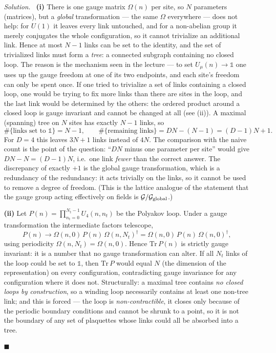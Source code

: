 \documentclass[11pt]{article}
\newenvironment{solution}{\par\smallskip\noindent\textit{Solution.}\ }{\hfill$\blacksquare$\par\smallskip}
\begin{document}
\begin{solution}
\textbf{(i)} There is one gauge matrix $\Omega(n)$ per site, so $N$ parameters (matrices), but a \emph{global} transformation --- the same $\Omega$ everywhere --- does not help: for $U(1)$ it leaves every link untouched, and for a non-abelian group it merely conjugates the whole configuration, so it cannot trivialize an additional link. Hence at most $N-1$ links can be set to the identity, and the set of trivialized links must form a \emph{tree}: a connected subgraph containing no closed loop. The reason is the mechanism seen in the lecture --- to set $U_\mu(n)\to\mathbb{1}$ one uses up the gauge freedom at one of its two endpoints, and each site's freedom can only be spent once. If one tried to trivialize a set of links containing a closed loop, one would be trying to fix more links than there are sites in the loop, and the last link would be determined by the others: the ordered product around a closed loop is gauge invariant and cannot be changed at all (see (ii)). A maximal (spanning) tree on $N$ sites has exactly $N-1$ links, so
\begin{equation}
\#\{\text{links set to }\mathbb{1}\} = N-1, \qquad \#\{\text{remaining links}\} = DN - (N-1) = (D-1)N + 1 .
\end{equation}
For $D=4$ this leaves $3N+1$ links instead of $4N$. The comparison with the naive count is the point of the question: ``$DN$ minus one parameter per site'' would give $DN - N = (D-1)N$, i.e.\ one link \emph{fewer} than the correct answer. The discrepancy of exactly $+1$ is the global gauge transformation, which is a redundancy of the redundancy: it acts trivially on the links, so it cannot be used to remove a degree of freedom. (This is the lattice analogue of the statement that the gauge group acting effectively on fields is $\mathcal{G}/\mathcal{G}_{\rm global}$.)

\textbf{(ii)} Let $P(n) = \prod_{n_t=0}^{N_t-1} U_4(n,n_t)$ be the Polyakov loop. Under a gauge transformation the intermediate factors telescope,
\begin{equation}
P(n) \to \Omega(n,0)\,P(n)\,\Omega(n,N_t)^\dagger = \Omega(n,0)\,P(n)\,\Omega(n,0)^\dagger ,
\end{equation}
using periodicity $\Omega(n,N_t) = \Omega(n,0)$. Hence $\mathrm{Tr}\,P(n)$ is strictly gauge invariant: it is a number that no gauge transformation can alter. If all $N_t$ links of the loop could be set to $\mathbb{1}$, then $\mathrm{Tr}\,P$ would equal $N$ (the dimension of the representation) on every configuration, contradicting gauge invariance for any configuration where it does not. Structurally: a maximal tree contains \emph{no closed loops by construction}, so a winding loop necessarily contains at least one non-tree link; and this is forced --- the loop is \emph{non-contractible}, it closes only because of the periodic boundary conditions and cannot be shrunk to a point, so it is not the boundary of any set of plaquettes whose links could all be absorbed into a tree.


\end{solution}
\end{document}
